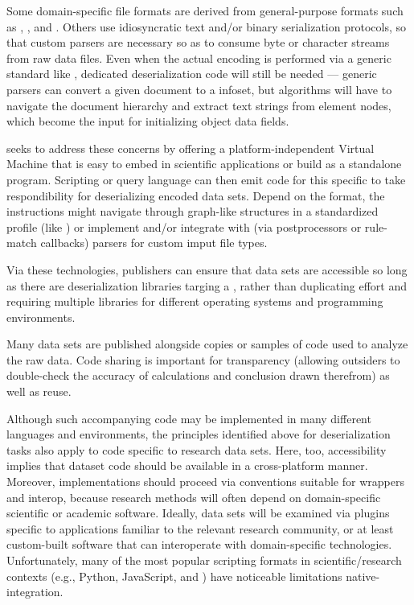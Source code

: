 \documentclass[11pt]{article}
\begin{document}
{{\begin{description}
\pseudoIndent{} Some domain-specific file formats are derived from general-purpose formats 
such as \CSV{}, \XML{}, and \JSON{}.  Others use idiosyncratic text and/or binary 
serialization protocols, so that custom parsers are necessary so as to consume byte or character 
streams from raw data files.  Even when the actual encoding is performed via a 
generic standard like \XML{}, dedicated deserialization code will still be needed --- 
generic parsers can convert a given \XML{} document to a %
\DOM{} infoset, but algorithms will have to navigate the document hierarchy and extract 
text strings from element nodes, which become the input for initializing 
object data fields.


\pseudoIndent{} \lPacTk{} seeks to address these concerns by offering a 
platform-independent Virtual Machine that is easy to embed in 
scientific applications or build as a standalone program.  Scripting 
or query language can then emit code for this specific \VM{} to 
take respondibility for deserializing encoded data sets.  Depend 
on the format, the \VM{} instructions might navigate through 
graph-like structures in a standardized profile (like \XML{}) 
or implement and/or integrate with (via postprocessors or 
rule-match callbacks) parsers for custom imput file types.

\pseudoIndent{} Via these technologies, publishers can ensure that 
data sets are accessible so long as there are deserialization 
libraries targing a \PacTk{} \VM{}, rather than duplicating 
effort and requiring multiple libraries for different operating 
systems and programming environments.  
 

\item[Analytic and Demonstrative Code]  Many data sets are published 
alongside copies or samples of code used to analyze the raw data.  
Code sharing is important for transparency (allowing outsiders 
to double-check the accuracy of calculations and conclusion 
drawn therefrom) as well as reuse.  

\pseudoIndent{} Although such accompanying code may be implemented 
in many different languages and environments, the \VM{} principles 
identified above for deserialization tasks also apply 
to code specific to research data sets.  Here, too, accessibility 
implies that dataset code should be available in a cross-platform 
manner.  Moreover, implementations should proceed via 
conventions suitable for \GUI{} wrappers and interop, because 
research methods will often depend on domain-specific 
scientific or academic software.  Ideally, data sets will 
be examined via plugins specific to applications familiar to 
the relevant research community, or at least custom-built 
software that can interoperate with domain-specific technologies.  
Unfortunately, many of the most popular scripting formats 
in scientific/research contexts (e.g., Python, JavaScript, and \R{}) 
have noticeable limitations \visavis{} native-\GUI{} integration.  


\end{description}}}
\end{document}
